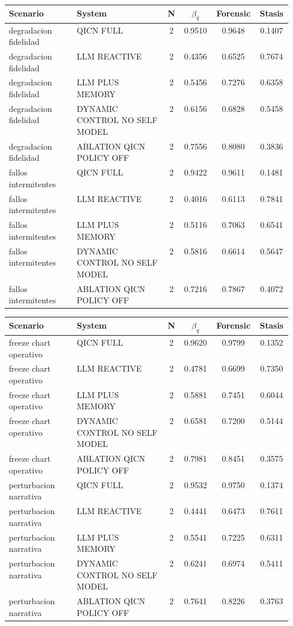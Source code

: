 \documentclass[11pt,a4paper]{article}
\theoremstyle{definition}
\begin{document}
\par\medskip\noindent
\begin{tabular}{>{\raggedright\arraybackslash}p{0.24\linewidth}>{\raggedright\arraybackslash}p{0.32\linewidth}cccc}
\toprule
Scenario & System & N & $\beta_q$ & Forensic & Stasis \\
\midrule
degradacion fidelidad & QICN FULL & 2 & 0.9510 & 0.9648 & 0.1407 \\
degradacion fidelidad & LLM REACTIVE & 2 & 0.4356 & 0.6525 & 0.7674 \\
degradacion fidelidad & LLM PLUS MEMORY & 2 & 0.5456 & 0.7276 & 0.6358 \\
degradacion fidelidad & DYNAMIC CONTROL NO SELF MODEL & 2 & 0.6156 & 0.6828 & 0.5458 \\
degradacion fidelidad & ABLATION QICN POLICY OFF & 2 & 0.7556 & 0.8080 & 0.3836 \\
fallos intermitentes & QICN FULL & 2 & 0.9422 & 0.9611 & 0.1481 \\
fallos intermitentes & LLM REACTIVE & 2 & 0.4016 & 0.6113 & 0.7841 \\
fallos intermitentes & LLM PLUS MEMORY & 2 & 0.5116 & 0.7063 & 0.6541 \\
fallos intermitentes & DYNAMIC CONTROL NO SELF MODEL & 2 & 0.5816 & 0.6614 & 0.5647 \\
fallos intermitentes & ABLATION QICN POLICY OFF & 2 & 0.7216 & 0.7867 & 0.4072 \\
\bottomrule
\end{tabular}
\par\medskip\noindent
\begin{tabular}{>{\raggedright\arraybackslash}p{0.24\linewidth}>{\raggedright\arraybackslash}p{0.32\linewidth}cccc}
\toprule
Scenario & System & N & $\beta_q$ & Forensic & Stasis \\
\midrule
freeze chart operativo & QICN FULL & 2 & 0.9620 & 0.9799 & 0.1352 \\
freeze chart operativo & LLM REACTIVE & 2 & 0.4781 & 0.6699 & 0.7350 \\
freeze chart operativo & LLM PLUS MEMORY & 2 & 0.5881 & 0.7451 & 0.6044 \\
freeze chart operativo & DYNAMIC CONTROL NO SELF MODEL & 2 & 0.6581 & 0.7200 & 0.5144 \\
freeze chart operativo & ABLATION QICN POLICY OFF & 2 & 0.7981 & 0.8451 & 0.3575 \\
perturbacion narrativa & QICN FULL & 2 & 0.9532 & 0.9750 & 0.1374 \\
perturbacion narrativa & LLM REACTIVE & 2 & 0.4441 & 0.6473 & 0.7611 \\
perturbacion narrativa & LLM PLUS MEMORY & 2 & 0.5541 & 0.7225 & 0.6311 \\
perturbacion narrativa & DYNAMIC CONTROL NO SELF MODEL & 2 & 0.6241 & 0.6974 & 0.5411 \\
perturbacion narrativa & ABLATION QICN POLICY OFF & 2 & 0.7641 & 0.8226 & 0.3763 \\
\bottomrule
\end{tabular}
\end{document}
